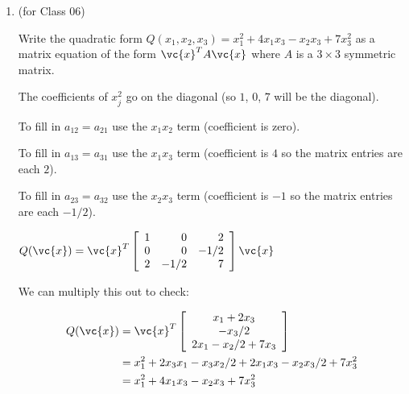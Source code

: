 \documentclass[12pt,letterpaper,answers]{exam}
\begin{document}
\begin{enumerate}
\begin{solution}
\end{solution}

\item (for Class 06)

Write the quadratic form $Q(x_1,x_2,x_3) = x_1^2 + 4x_1x_3 - x_2x_3 + 7x_3^2$ as a matrix equation of the form $\vc{x}^TA\vc{x}$ where $A$ is a $3\times 3$ symmetric matrix.

\begin{solution}
The coefficients of $x_j^2$ go on the diagonal (so $1$, $0$, $7$ will be the diagonal).

To fill in $a_{12} = a_{21}$ use the $x_1x_2$ term (coefficient is zero).

To fill in $a_{13} = a_{31}$ use the $x_1x_3$ term (coefficient is $4$ so the matrix entries are each $2$).

To fill in $a_{23} = a_{32}$ use the $x_2x_3$ term (coefficient is $-1$ so the matrix entries are each $-1/2$).


$Q(\vc{x}) = \vc{x}^T\left[\begin{array}{r r r} 
1 & 0 & 2 \\
0 & 0 & -1/2 \\
2 & -1/2 & 7
\end{array}\right] \vc{x}$

We can multiply this out to check:

\begin{align*}
    Q(\vc{x}) &= \vc{x}^T\left[\begin{array}{c}
x_1 + 2x_3 \\
-x_3/2 \\
2x_1 - x_2/2 + 7x_3
\end{array}
\right] \\
&= x_1^2 + 2x_3x_1 - x_3x_2/2 + 2x_1x_3-x_2x_3/2 + 7x_3^2 \\
&= x_1^2 + 4x_1x_3 - x_2x_3 + 7x_3^2
\end{align*}
\end{solution}


\end{enumerate}
\end{document}

